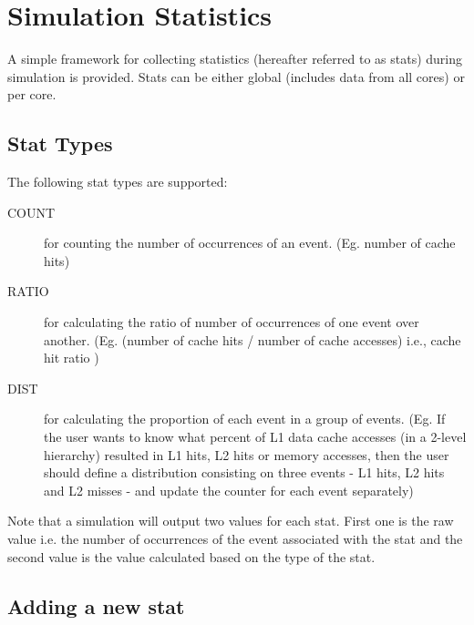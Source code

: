 

\chapter{Simulation Statistics}
\label{sec:stat}

A simple framework for collecting statistics (hereafter referred to as stats)
during simulation is provided.  Stats can be either global (includes
data from all cores) or per core.

\section{Stat Types}

The following stat types are supported:

\begin{description}

  \item [COUNT] for counting the number of occurrences of an event. (Eg. number
  of cache hits)

  \item [RATIO] for calculating the ratio of number of occurrences of one event
  over another. (Eg. (number of cache hits / number of cache accesses) i.e.,
  cache hit ratio )

  \item [DIST]  for calculating the proportion of each event in a group of
  events. (Eg. If the user wants to know what percent of L1 data cache accesses 
  (in a 2-level hierarchy) resulted in L1 hits, L2 hits or memory accesses, then the
  user should define a distribution consisting on three events - L1 hits,
  L2 hits and L2 misses  - and update the counter for each event separately) 

\end{description}

Note that a simulation will output two values for each stat. First one is the
raw value i.e. the number of occurrences of the event associated with the
stat and the second value is the value calculated based on the type
of the stat.


\section{Adding a new stat}

